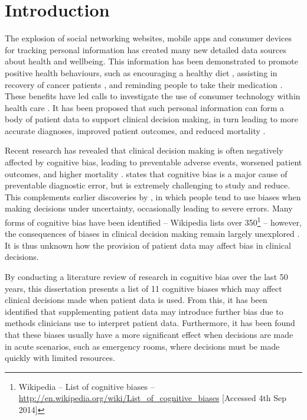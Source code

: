 \documentclass[a4paper]{scrartcl}     %
\begin{document}
\clearpage\section{Introduction} %

  The explosion of social networking websites, mobile apps and consumer devices for tracking personal information has created many new detailed data sources about health and wellbeing. This information has been demonstrated to promote positive health behaviours, such as encouraging a healthy diet \citep{Brown2006}, assisting in recovery of cancer patients \citep{Jacobs2014}, and reminding people to take their medication \citep{Stawarz2014}. These benefits have led calls to investigate the use of consumer technology within health care \citep{Swan2009}. It has been proposed that such personal information can form a body of patient data to support clinical decision making, in turn leading to more accurate diagnoses, improved patient outcomes, and reduced mortality \citep{Rooksby2014}.

  Recent research has revealed that clinical decision making is often negatively affected by cognitive bias, leading to preventable adverse events, worsened patient outcomes, and higher mortality \citep{Croskerry2013}. \citet{Graber2002} states that cognitive bias is a major cause of preventable diagnostic error, but is extremely challenging to study and reduce. This complements earlier discoveries by \citet{Kahneman1982}, in which people tend to use biases when making decisions under uncertainty, occasionally leading to severe errors. Many forms of cognitive bias have been identified -- Wikipedia lists over 350\footnote{Wikipedia -- List of cognitive biases -- \url{http://en.wikipedia.org/wiki/List_of_cognitive_biases} [Accessed 4th Sep 2014]} -- however, the consequences of biases in clinical decision making remain largely unexplored \citep{Croskerry2013}. It is thus unknown how the provision of patient data may affect bias in clinical decisions.

  By conducting a literature review of research in cognitive bias over the last 50 years, this dissertation presents a list of 11 cognitive biases which may affect clinical decisions made when patient data is used. From this, it has been identified that supplementing patient data may introduce further bias due to methods clinicians use to interpret patient data. Furthermore, it has been found that these biases usually have a more significant effect when decisions are made in acute scenarios, such as emergency rooms, where decisions must be made quickly with limited resources.
\end{document}
